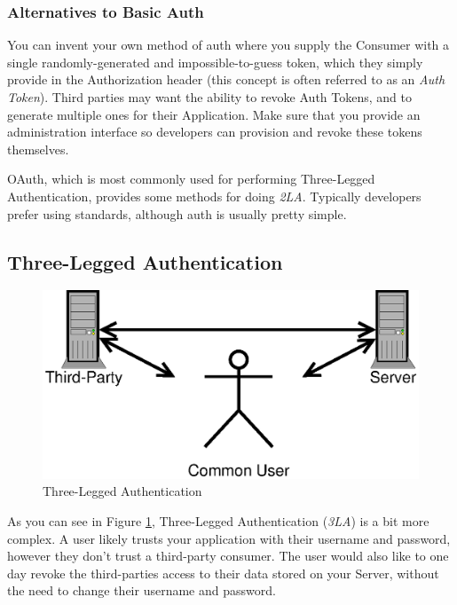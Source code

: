 \documentclass{book}
\begin{document}
\subsubsection{Alternatives to Basic Auth}

You can invent your own method of auth where you supply the Consumer with a single randomly-generated and impossible-to-guess token, which they simply provide in the Authorization header (this concept is often referred to as an \emph{Auth Token}). Third parties may want the ability to revoke Auth Tokens, and to generate multiple ones for their Application. Make sure that you provide an administration interface so developers can provision and revoke these tokens themselves.

OAuth, which is most commonly used for performing Three-Legged Authentication, provides some methods for doing \emph{2LA}. Typically developers prefer using standards, although auth is usually pretty simple.

\subsection{Three-Legged Authentication}

\begin{figure}[!htb]
\centering
\includegraphics[scale=.6]{images/three-legged.eps}
\caption{Three-Legged Authentication}
\label{fig:threelegged}
\end{figure}

As you can see in Figure \ref{fig:threelegged}, Three-Legged Authentication (\emph{3LA}) is a bit more complex. A user likely trusts your application with their username and password, however they don't trust a third-party consumer. The user would also like to one day revoke the third-parties access to their data stored on your Server, without the need to change their username and password.
\end{document}
